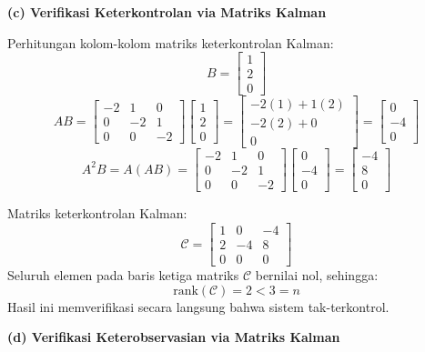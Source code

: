 \documentclass[11pt,a4paper]{article}
\begin{document}
\textbf{(c) Verifikasi Keterkontrolan via Matriks Kalman}

Perhitungan kolom-kolom matriks keterkontrolan Kalman:
$$B = \begin{bmatrix} 1 \\ 2 \\ 0 \end{bmatrix}$$
$$AB = \begin{bmatrix} -2 & 1 & 0 \\ 0 & -2 & 1 \\ 0 & 0 & -2 \end{bmatrix} \begin{bmatrix} 1 \\ 2 \\ 0 \end{bmatrix} = \begin{bmatrix} -2(1) + 1(2) \\ -2(2) + 0 \\ 0 \end{bmatrix} = \begin{bmatrix} 0 \\ -4 \\ 0 \end{bmatrix}$$
$$A^2 B = A(AB) = \begin{bmatrix} -2 & 1 & 0 \\ 0 & -2 & 1 \\ 0 & 0 & -2 \end{bmatrix} \begin{bmatrix} 0 \\ -4 \\ 0 \end{bmatrix} = \begin{bmatrix} -4 \\ 8 \\ 0 \end{bmatrix}$$

Matriks keterkontrolan Kalman:
$$\mathcal{C} = \begin{bmatrix} 1 & 0 & -4 \\ 2 & -4 & 8 \\ 0 & 0 & 0 \end{bmatrix}$$
Seluruh elemen pada baris ketiga matriks $\mathcal{C}$ bernilai nol, sehingga:
$$\text{rank}(\mathcal{C}) = 2 < 3 = n$$
Hasil ini memverifikasi secara langsung bahwa sistem tak-terkontrol.

\textbf{(d) Verifikasi Keterobservasian via Matriks Kalman}
\end{document}
